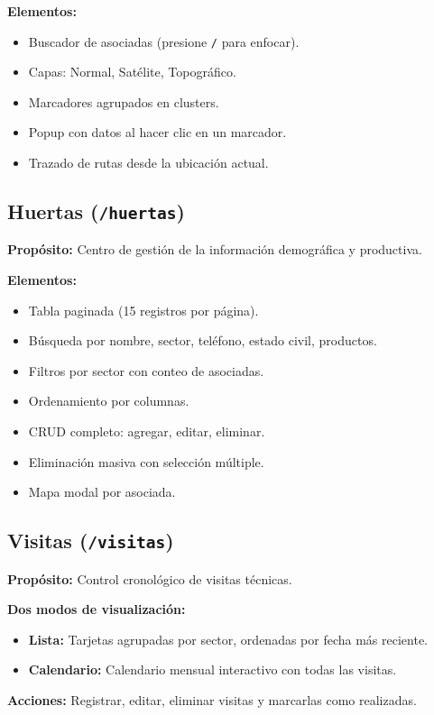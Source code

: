 \documentclass[12pt]{article}
\begin{document}
\textbf{Elementos:}
\begin{itemize}[nosep]
  \item Buscador de asociadas (presione \texttt{/} para enfocar).
  \item Capas: Normal, Sat\'elite, Topogr\'afico.
  \item Marcadores agrupados en clusters.
  \item Popup con datos al hacer clic en un marcador.
  \item Trazado de rutas desde la ubicaci\'on actual.
\end{itemize}

\subsection{Huertas (\texttt{/huertas})}
\textbf{Prop\'osito:} Centro de gesti\'on de la informaci\'on demogr\'afica y productiva.

\textbf{Elementos:}
\begin{itemize}[nosep]
  \item Tabla paginada (15 registros por p\'agina).
  \item B\'usqueda por nombre, sector, tel\'efono, estado civil, productos.
  \item Filtros por sector con conteo de asociadas.
  \item Ordenamiento por columnas.
  \item CRUD completo: agregar, editar, eliminar.
  \item Eliminaci\'on masiva con selecci\'on m\'ultiple.
  \item Mapa modal por asociada.
\end{itemize}

\subsection{Visitas (\texttt{/visitas})}
\textbf{Prop\'osito:} Control cronol\'ogico de visitas t\'ecnicas.

\textbf{Dos modos de visualizaci\'on:}
\begin{itemize}[nosep]
  \item \textbf{Lista:} Tarjetas agrupadas por sector, ordenadas por fecha m\'as reciente.
  \item \textbf{Calendario:} Calendario mensual interactivo con todas las visitas.
\end{itemize}
\textbf{Acciones:} Registrar, editar, eliminar visitas y marcarlas como realizadas.
\end{document}
